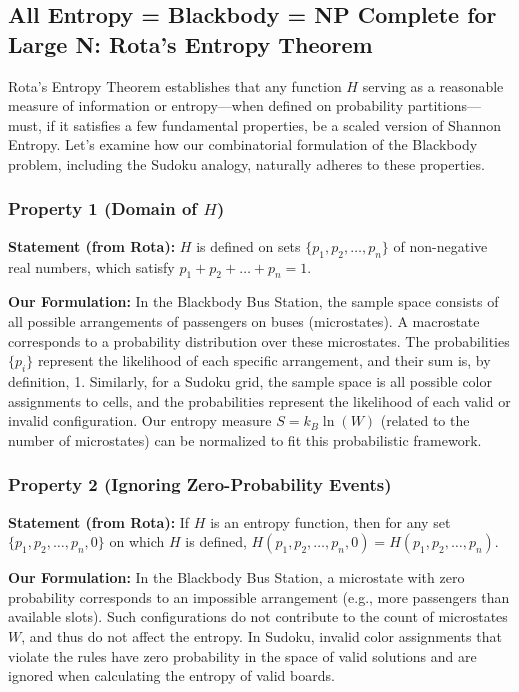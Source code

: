 \documentclass{report}
\begin{document}
\subsection*{All Entropy = Blackbody = NP Complete for Large N: Rota's Entropy Theorem}

Rota's Entropy Theorem establishes that any function \(H\) serving as a reasonable measure of information or entropy—when defined on probability partitions—must, if it satisfies a few fundamental properties, be a scaled version of Shannon Entropy. Let's examine how our combinatorial formulation of the Blackbody problem, including the Sudoku analogy, naturally adheres to these properties.

\subsubsection*{Property 1 (Domain of \(H\))}
\textbf{Statement (from Rota):} \(H\) is defined on sets \( \{p_1, p_2, \ldots, p_n\} \) of non-negative real numbers, which satisfy \( p_1 + p_2 + \ldots + p_n = 1 \).

\textbf{Our Formulation:} In the Blackbody Bus Station, the sample space consists of all possible arrangements of passengers on buses (microstates). A macrostate corresponds to a probability distribution over these microstates. The probabilities \( \{p_i\} \) represent the likelihood of each specific arrangement, and their sum is, by definition, 1. Similarly, for a Sudoku grid, the sample space is all possible color assignments to cells, and the probabilities represent the likelihood of each valid or invalid configuration. Our entropy measure \(S = k_B \ln(W)\) (related to the number of microstates) can be normalized to fit this probabilistic framework.

\subsubsection*{Property 2 (Ignoring Zero-Probability Events)}
\textbf{Statement (from Rota):} If \( H \) is an entropy function, then for any set \( \{p_1, p_2, \ldots, p_n, 0\} \) on which \( H \) is defined, \( H(p_1, p_2, \ldots, p_n, 0) = H(p_1, p_2, \ldots, p_n) \).

\textbf{Our Formulation:} In the Blackbody Bus Station, a microstate with zero probability corresponds to an impossible arrangement (e.g., more passengers than available slots). Such configurations do not contribute to the count of microstates \(W\), and thus do not affect the entropy. In Sudoku, invalid color assignments that violate the rules have zero probability in the space of valid solutions and are ignored when calculating the entropy of valid boards.
\end{document}
